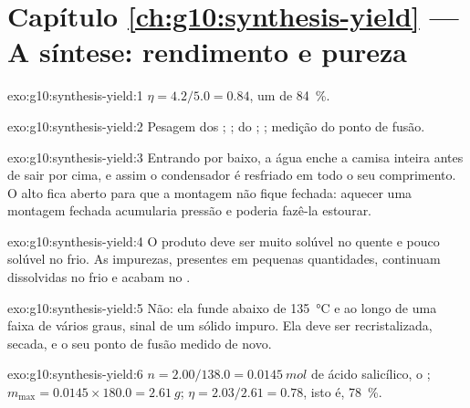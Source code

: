 \section*{Capítulo \ref{ch:g10:synthesis-yield} --- A síntese: rendimento e pureza}

\begin{solution}{exo:g10:synthesis-yield:1}
$\eta = 4.2 / 5.0 = 0.84$, um  de \qty{84}{\percent}.
\end{solution}

\begin{solution}{exo:g10:synthesis-yield:2}
Pesagem dos ; ;  do
; ; medição do ponto de fusão.
\end{solution}

\begin{solution}{exo:g10:synthesis-yield:3}
Entrando por baixo, a água enche a camisa inteira antes de sair por
cima, e assim o condensador é resfriado em todo o seu comprimento. O
alto fica aberto para que a montagem não fique fechada: aquecer uma
montagem fechada acumularia pressão e poderia fazê-la estourar.
\end{solution}

\begin{solution}{exo:g10:synthesis-yield:4}
O produto deve ser muito solúvel no  quente e pouco solúvel no
 frio. As impurezas, presentes em pequenas quantidades,
continuam dissolvidas no  frio e acabam no .
\end{solution}

\begin{solution}{exo:g10:synthesis-yield:5}
Não: ela funde abaixo de \qty{135}{\celsius} e ao longo de uma faixa de
vários graus, sinal de um sólido impuro. Ela deve ser recristalizada,
secada, e o seu ponto de fusão medido de novo.
\end{solution}

\begin{solution}{exo:g10:synthesis-yield:6}
$n = 2.00 / 138.0 = \qty{0.0145}{mol}$ de ácido salicílico, o ; $m_{\max} = 0.0145 \times 180.0 = \qty{2.61}{g}$;
$\eta = 2.03 / 2.61 = 0.78$, isto é, \qty{78}{\percent}.
\end{solution}

